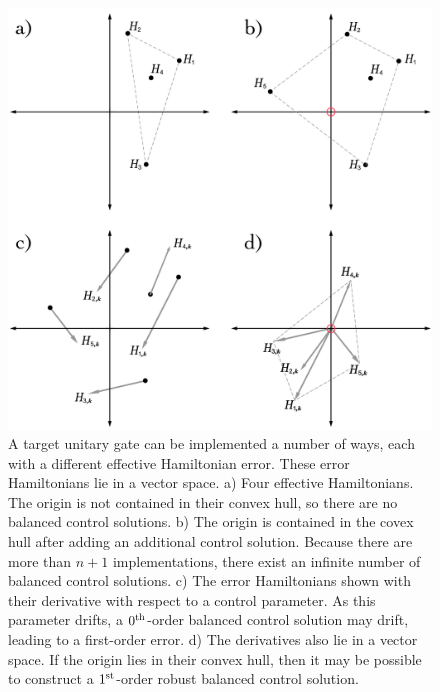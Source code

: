\documentclass[aps,nofootinbib,pra,notitlepage,twocolumn]{revtex4-1}
\begin{document}
\begin{figure}
  \centering
  \includegraphics[width=\columnwidth]{vectorspace.pdf}
  \caption{A target unitary gate can be implemented a number of ways, each with a different effective Hamiltonian error. These error Hamiltonians lie in a vector space. a) Four effective Hamiltonians. The origin is not contained in their convex hull, so there are no balanced control solutions. b) The origin is contained in the covex hull after adding an additional control solution. Because there are more than $n+1$ implementations, there exist an infinite number of balanced control solutions. c) The error Hamiltonians shown with their derivative with respect to a control parameter. As this parameter drifts, a $0^{\rm th}$-order balanced control solution may drift, leading to a first-order error. d) The derivatives also lie in a vector space. If the origin lies in their convex hull, then it may be possible to construct a $1^{\rm{st}}$-order robust balanced control solution.}
  \label{fig:vectorspace}
\end{figure}
\end{document}
